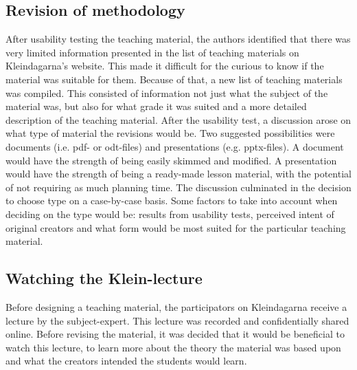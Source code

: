 \subsection{Revision of methodology}
After usability testing the teaching material, the authors identified that there was very limited information presented in the list of teaching materials on Kleindagarna's website. This made it difficult for the curious to know if the material was suitable for them. Because of that, a new list of teaching materials was compiled. This consisted of information not just what the subject of the material was, but also for what grade it was suited and a more detailed description of the teaching material.
After the usability test, a discussion arose on what type of material the revisions would be. Two suggested possibilities were documents (i.e. pdf- or odt-files) and presentations (e.g. pptx-files). A document would have the strength of being easily skimmed and modified. A presentation would have the strength of being a ready-made lesson material, with the potential of not requiring as much planning time. The discussion culminated in the decision to choose type on a case-by-case basis. Some factors to take into account when deciding on the type would be: results from usability tests, perceived intent of original creators and what form would be most suited for the particular teaching material.
\subsection{Watching the Klein-lecture}
Before designing a teaching material, the participators on Kleindagarna receive a lecture by the subject-expert. This lecture was recorded and confidentially shared online. Before revising the material, it was decided that it would be beneficial to watch this lecture, to learn more about the theory the material was based upon and what the creators intended the students would learn.
